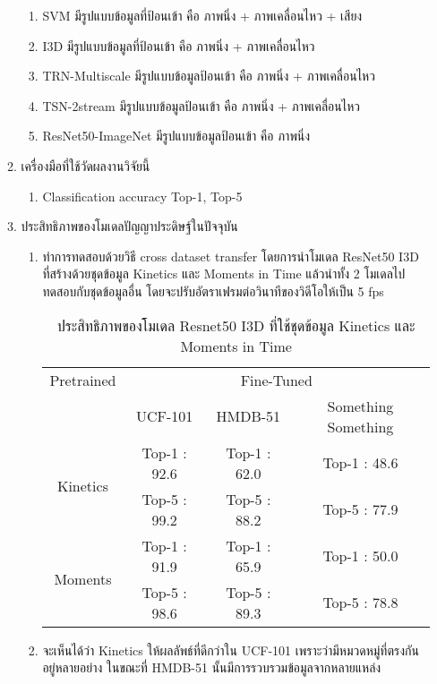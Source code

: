 \begin{enumerate}
\begin{enumerate}
			\begin{enumerate}
				\item SVM มีรูปแบบข้อมูลที่ป้อนเข้า คือ ภาพนิ่ง + ภาพเคลื่อนไหว + เสียง
				\item I3D มีรูปแบบข้อมูลที่ป้อนเข้า คือ ภาพนิ่ง + ภาพเคลื่อนไหว
				\item TRN-Multiscale มีรูปแบบข้อมูลป้อนเข้า คือ ภาพนิ่ง + ภาพเคลื่อนไหว
				\item TSN-2stream มีรูปแบบข้อมูลป้อนเข้า คือ ภาพนิ่ง + ภาพเคลื่อนไหว
				\item ResNet50-ImageNet	มีรูปแบบข้อมูลป้อนเข้า คือ ภาพนิ่ง
			\end{enumerate}
		\item เครื่องมือที่ใช้วัดผลงานวิจัยนี้
			\begin{enumerate}
				\item Classification accuracy Top-1, Top-5
			\end{enumerate}
		\item ประสิทธิภาพของโมเดลปัญญาประดิษฐ์ในปัจจุบัน
			\begin{enumerate}
				\item ทำการทดสอบด้วยวิธี cross dataset transfer โดยการนำโมเดล ResNet50 I3D ที่สร้างด้วยชุดข้อมูล Kinetics และ Moments in Time 
				แล้วนำทั้ง 2 โมเดลไปทดสอบกับชุดข้อมูลอื่น โดยจะปรับอัตราเฟรมต่อวินาทีของวิดีโอให้เป็น 5 fps
				\begin{table}[!ht]
					\centering
					\begin{tabular}{|c|c|c|c|}
						\hline
						{Pretrained}&\multicolumn{3}{c|}{Fine-Tuned}\\
						\cline{2-4}
						{}								& UCF-101			& HMDB-51			& Something Something			\\
						\hline
						\multirow{2}{*}{Kinetics}		& Top-1 : 92.6		& Top-1 : 62.0		& Top-1 : 48.6		\\
						{}								& Top-5 : 99.2		& Top-5 : 88.2		& Top-5 : 77.9		\\
						\hline
						\multirow{2}{*}{Moments}		& Top-1 : 91.9		& Top-1 : 65.9		& Top-1 : 50.0		\\
						{}								& Top-5 : 98.6		& Top-5 : 89.3		& Top-5 : 78.8		\\
						\hline
					\end{tabular}
					\caption{ประสิทธิภาพของโมเดล Resnet50 I3D ที่ใช้ชุดข้อมูล Kinetics และ Moments in Time}
					\label{tab: Data transfer performance ของโมเดล Resnet50 I3D}
				\end{table}
				\item จะเห็นได้ว่า Kinetics ให้ผลลัพธ์ที่ดีกว่าใน UCF-101 เพราะว่ามีหมวดหมู่ที่ตรงกันอยู่หลายอย่าง ในขณะที่ HMDB-51 นั้นมีการรวบรวมข้อมูลจากหลายแหล่ง 

\end{enumerate}
\end{enumerate}
\end{enumerate}
